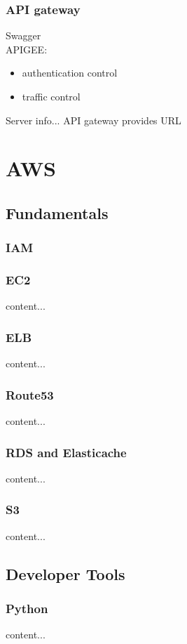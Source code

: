 \documentclass{beamer}
\begin{document}
\begin{frame}\frametitle{API gateway}
	Swagger\\
	APIGEE:\\
	\begin{itemize}
		\item authentication control
		\item traffic control
	\end{itemize}
	Server info... API gateway provides URL
\end{frame}







\section{AWS}
\subsection{Fundamentals}

\begin{frame}\frametitle{IAM}
	
\end{frame}

\begin{frame}\frametitle{EC2}
content...
\end{frame}

\begin{frame}\frametitle{ELB}
content...
\end{frame}

\begin{frame}\frametitle{Route53}
content...
\end{frame}

\begin{frame}\frametitle{RDS and Elasticache}
content...
\end{frame}

\begin{frame}\frametitle{S3}
content...
\end{frame}


\subsection{Developer Tools}
\begin{frame}\frametitle{Python}
content...
\end{frame}
\end{document}
